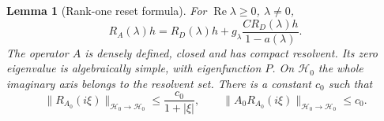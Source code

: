 \documentclass[11pt,a4paper]{article}
\numberwithin{equation}{section}
\newtheorem{lemma}[theorem]{Lemma}
\theoremstyle{remark}\newtheorem{remark}[theorem]{Remark}
\newcommand{\HH}{\mathcal H}\newcommand{\DD}{\mathcal D}
\DeclareMathOperator{\Rea}{Re}
\begin{document}
\begin{lemma}[Rank-one reset formula]\label{lem:reset-resolvent}
For $\Rea\lambda\geq0$, $\lambda\ne0$,
\begin{equation}\label{eq:reset-resolvent}
 R_A(\lambda)h=R_D(\lambda)h+
 g_\lambda\frac{CR_D(\lambda)h}{1-a(\lambda)}.
\end{equation}
The operator $A$ is densely defined, closed and has compact resolvent. Its zero eigenvalue is algebraically simple, with eigenfunction $P$. On $\HH_0$ the whole imaginary axis belongs to the resolvent set. There is a constant $c_0$ such that
\begin{equation}\label{eq:imag-bounds}
 \|R_{A_0}(i\xi)\|_{\HH_0\to\HH_0}
 \leq\frac{c_0}{1+|\xi|},\qquad
 \|A_0R_{A_0}(i\xi)\|_{\HH_0\to\HH_0}\leq c_0.
\end{equation}
\end{lemma}
\end{document}
